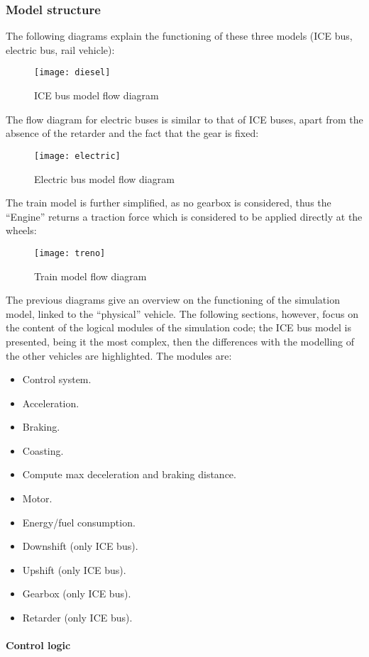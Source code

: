 \documentclass{article}
\newcommand{\subsubsubsection}[1]{\paragraph{#1}\mbox{}\\}
\begin{document}
\subsubsection{Model structure}
The following diagrams explain the functioning of these three models (ICE bus, electric bus, rail vehicle): 
\begin{figure}[H]
\centering
\texttt{[image: diesel]}
\caption{ICE bus model flow diagram}
\end{figure} 

The flow diagram for electric buses is similar to that of ICE buses, apart from the absence of the retarder and the fact that the gear is fixed: 
\begin{figure}[H]
\centering
\texttt{[image: electric]}
\caption{Electric bus model flow diagram}
\end{figure} 
\newpage
\noindent The train model is further simplified, as no gearbox is considered, thus the “Engine” returns a traction force which is considered to be applied directly at the wheels: 
\begin{figure}[H]
\centering
\texttt{[image: treno]}
\caption{Train model flow diagram}
\end{figure} 
The previous diagrams give an overview on the functioning of the simulation model, linked to the “physical” vehicle. The following sections, however, focus on the content of the logical modules of the simulation code; the ICE bus model is presented, being it the most complex, then the differences with the modelling of the other vehicles are highlighted. The modules are: 
\begin{itemize}
\item Control system.
\item Acceleration. 
\item Braking.
\item Coasting.
\item Compute max deceleration and braking distance. 
\item Motor.
\item Energy/fuel consumption.
\item Downshift (only ICE bus).
\item Upshift (only ICE bus).
\item Gearbox (only ICE bus).
\item Retarder (only ICE bus).
\end{itemize}
\newpage
\subsubsubsection{Control logic}
\end{document}
